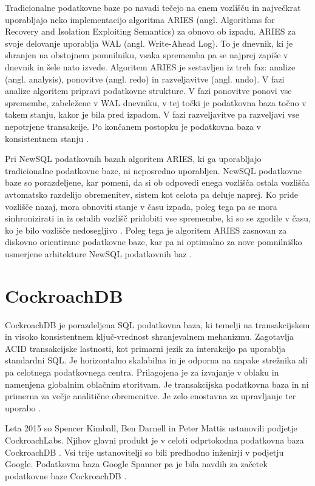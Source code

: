 \documentclass[a4paper, 12pt]{book}
\begin{document}
Tradicionalne podatkovne baze po navadi tečejo na enem vozlišču in naj\-več\-krat uporabljajo neko implementacijo algoritma ARIES (angl. Algorithms for Recovery and Isolation Exploiting Semantics) \cite{aries} za obnovo ob izpadu. ARIES za svoje delovanje uporablja WAL (angl. Write-Ahead Log). To je dnevnik, ki je shranjen na obstojnem pomnilniku, vsaka sprememba pa se najprej zapiše v dnevnik in šele nato izvede. Algoritem ARIES je sestavljen iz treh faz: analize (angl. analysis), ponovitve (angl. redo) in razveljavitve (angl. undo). V fazi analize algoritem pripravi podatkovne strukture. V fazi ponovitve ponovi vse spremembe, zabeležene v WAL dnevniku, v tej točki je podatkovna baza točno v takem stanju, kakor je bila pred izpadom. V fazi razveljavitve pa razveljavi vse nepotrjene transakcije. Po končanem postopku je podatkovna baza v konsistentnem stanju \cite{Pavlo2016Sep}.

Pri NewSQL podatkovnih bazah algoritem ARIES, ki ga uporabljajo tradicionalne podatkovne baze, ni neposredno uporabljen. NewSQL podatkovne baze so porazdeljene, kar pomeni, da si ob odpovedi enega vozlišča ostala vozlišča avtomatsko razdelijo obremenitev, sistem kot celota pa deluje naprej. Ko pride vozlišče nazaj, mora obnoviti stanje v času izpada, poleg tega pa se mora sinhronizirati in iz ostalih vozlišč pridobiti vse spremembe, ki so se zgodile v času, ko je bilo vozlišče nedosegljivo \cite{Pavlo2016Sep}. Poleg tega je algoritem ARIES zasnovan za diskovno orientirane podatkovne baze, kar pa ni optimalno za nove pomnilniško usmerjene arhitekture NewSQL podatkovnih baz \cite{zheng2014fast}.




\chapter{CockroachDB}
\label{cockroachdb}
CockroachDB je porazdeljena SQL podatkovna baza, ki temelji na transakcijskem in visoko konsistentnem ključ-vrednost shranjevalnem mehanizmu. Zagotavlja ACID transakcijske lastnosti, kot primarni jezik za interakcijo pa uporablja standardni SQL. Je horizontalno skalabilna in je odporna na napake strežnika ali pa celotnega podatkovnega centra. Prilagojena je za izvajanje v oblaku in namenjena globalnim oblačnim storitvam. Je transakcijska podatkovna baza in ni primerna za večje analitične obremenitve. Je zelo enostavna za upravljanje ter uporabo \cite{CRDB-FAQ}.

Leta 2015 so Spencer Kimball, Ben Darnell in Peter Mattis ustanovili podjetje CockroachLabs. Njihov glavni produkt je v celoti odprtokodna podatkovna baza CockroachDB \cite{cockroachdb/cockroach}. Vsi trije ustanovitelji so bili predhodno inženirji v podjetju Google. Podatkovna baza Google Spanner pa je bila navdih za začetek podatkovne baze CockroachDB \cite{CRDB-2017}.
\end{document}
